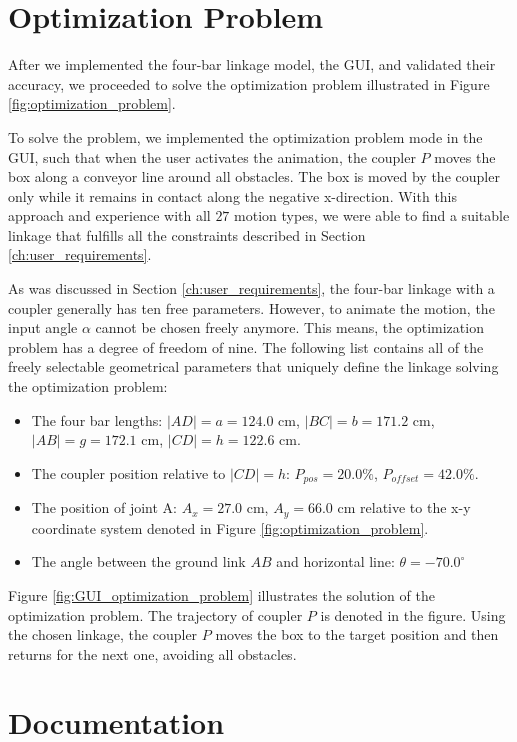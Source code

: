 \documentclass{article}
\begin{document}
\section{Optimization Problem}\label{ch:optimization-problem}

After we implemented the four-bar linkage model, the GUI, and validated their accuracy, we proceeded to solve the optimization problem illustrated in Figure \ref{fig:optimization_problem}.

To solve the problem, we implemented the optimization problem mode in the GUI, such that when the user activates the animation, the coupler $P$ moves the box along a conveyor line around all obstacles. The box is moved by the coupler only while it remains in contact along the negative x-direction. With this approach and experience with all $27$ motion types, we were able to find a suitable linkage that fulfills all the constraints described in Section \ref{ch:user_requirements}.

As was discussed in Section \ref{ch:user_requirements}, the four-bar linkage with a coupler generally has ten free parameters. However, to animate the motion, the input angle $\alpha$ cannot be chosen freely anymore. This means, the optimization problem has a degree of freedom of nine. The following list contains all of the freely selectable geometrical parameters that uniquely define the linkage solving the optimization problem:
\begin{itemize}
	\item The four bar lengths: $|AD| = a = 124.0$ cm, $|BC| = b = 171.2$ cm, $|AB| = g = 172.1$ cm, $|CD| = h = 122.6$ cm.
	\item The coupler position relative to $|CD| = h$: $P_{pos} = 20.0 \%$, $P_{offset} = 42.0 \%$.
	\item The position of joint A: $A_x = 27.0$ cm, $A_y = 66.0$ cm relative to the x-y coordinate system denoted in Figure \ref{fig:optimization_problem}.
	\item The angle between the ground link $AB$ and horizontal line: $\theta = -70.0^{\circ}$
\end{itemize}

Figure \ref{fig:GUI_optimization_problem} illustrates the solution of the optimization problem. The trajectory of coupler $P$ is denoted in the figure. Using the chosen linkage, the coupler $P$ moves the box to the target position and then returns for the next one, avoiding all obstacles.

\section{Documentation}\label{ch:doc}
\end{document}
